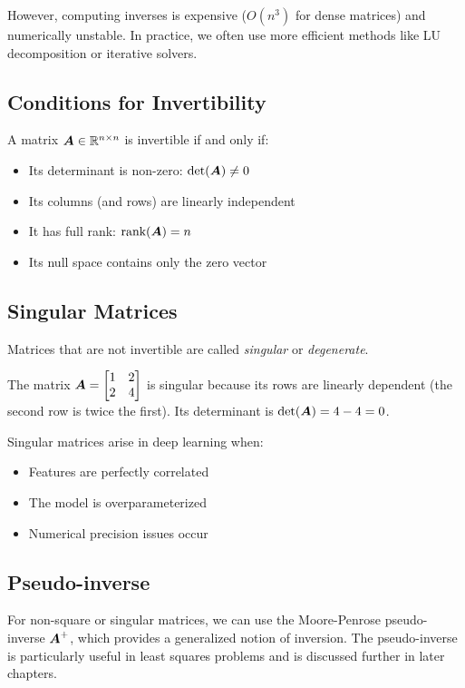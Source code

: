 However, computing inverses is expensive ($O(n^3)$ for dense matrices) and numerically unstable. In practice, we often use more efficient methods like LU decomposition or iterative solvers.

\subsection{Conditions for Invertibility}

A matrix $\boldsymbol{A} \in \mathbb{R}^{n \times n}$ is invertible if and only if:
\begin{itemize}
    \item Its determinant is non-zero: $\det(\boldsymbol{A}) \neq 0$
    \item Its columns (and rows) are linearly independent
    \item It has full rank: $\text{rank}(\boldsymbol{A}) = n$
    \item Its null space contains only the zero vector
\end{itemize}

\subsection{Singular Matrices}

Matrices that are not invertible are called \emph{singular} or \emph{degenerate}.

\begin{example}
The matrix $\boldsymbol{A} = \begin{bmatrix} 1 & 2 \\ 2 & 4 \end{bmatrix}$ is singular because its rows are linearly dependent (the second row is twice the first). Its determinant is $\det(\boldsymbol{A}) = 4 - 4 = 0$.
\end{example}

Singular matrices arise in deep learning when:
\begin{itemize}
    \item Features are perfectly correlated
    \item The model is overparameterized
    \item Numerical precision issues occur
\end{itemize}

\subsection{Pseudo-inverse}

For non-square or singular matrices, we can use the Moore-Penrose pseudo-inverse $\boldsymbol{A}^+$, which provides a generalized notion of inversion. The pseudo-inverse is particularly useful in least squares problems and is discussed further in later chapters.

